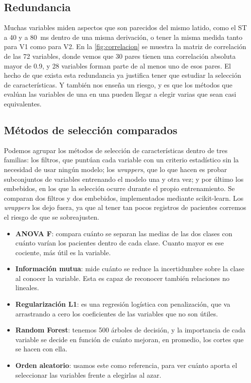 \subsection{Redundancia}

Muchas variables miden aspectos que son parecidos del mismo latido, como el ST a \num{40} y a \SI{80}{\milli\second} dentro de una misma derivación, o tener la misma medida tanto para V1 como para V2. En la \cref{fig:correlacion} se muestra la matriz de correlación de las 72 variables, donde vemos que 30 pares tienen una correlación absoluta mayor de \num{0.9}, y 28 variables forman parte de al menos uno de esos pares. El hecho de que exista esta redundancia ya justifica tener que estudiar la selección de características. Y también nos enseña un riesgo, y es que los métodos que evalúan las variables de una en una pueden llegar a elegir varias que sean casi equivalentes.


\subsection{Métodos de selección comparados}

Podemos agrupar los métodos de selección de características dentro de tres familias: los filtros, que puntúan cada variable con un criterio estadístico sin la necesidad de usar ningún modelo; los \emph{wrappers}, que lo que hacen es probar subconjuntos de variables entrenando el modelo una y otra vez; y por último los embebidos, en los que la selección ocurre durante el propio entrenamiento. Se comparan dos filtros y dos embebidos, implementados mediante scikit-learn. Los \emph{wrappers} los dejo fuera, ya que al tener tan pocos registros de pacientes corremos el riesgo de que se sobreajusten.

\begin{itemize}
  \item \textbf{ANOVA F}: compara cuánto se separan las medias de las dos clases con cuánto varían los pacientes dentro de cada clase. Cuanto mayor es ese cociente, más útil es la variable.
  \item \textbf{Información mutua}: mide cuánto se reduce la incertidumbre sobre la clase al conocer la variable. Esta es capaz de reconocer también relaciones no lineales.
  \item \textbf{Regularización L1}: es una regresión logística con penalización, que va arrastrando a cero los coeficientes de las variables que no son útiles.
  \item \textbf{Random Forest}: tenemos 500 árboles de decisión, y la importancia de cada variable se decide en función de cuánto mejoran, en promedio, los cortes que se hacen con ella.
  \item \textbf{Orden aleatorio}: usamos este como referencia, para ver cuánto aporta el seleccionar las variables frente a elegirlas al azar.
\end{itemize}

